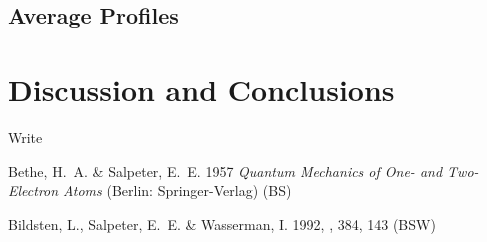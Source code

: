 \documentclass{emulateapj}
\begin{document}

\subsection{Average Profiles}

\section{Discussion and Conclusions}

\acknowledgments

Write

\begin{references}

\noindent
Bethe, H.~A. \& Salpeter, E.~E. 1957 \textit{Quantum Mechanics of One-
  and Two-Electron Atoms} (Berlin: Springer-Verlag) (BS) 

\noindent
Bildsten, L., Salpeter, E.~E. \& Wasserman, I. 1992, \apj, 384, 143
(BSW) 


\end{references}
\end{document}
